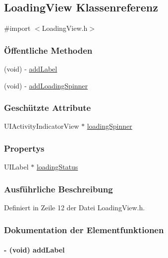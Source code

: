 \hypertarget{interface_loading_view}{
\subsection{LoadingView Klassenreferenz}
\label{interface_loading_view}
}


{\ttfamily \#import $<$LoadingView.h$>$}\subsubsection*{Öffentliche Methoden}
\begin{DoxyCompactItemize}
\item 
(void) -\/ \hyperlink{interface_loading_view_a06c086509cd10697ee633fb93d9eadf7}{addLabel}
\item 
(void) -\/ \hyperlink{interface_loading_view_a4b7cbaae54014af138245cdcd176ee45}{addLoadingSpinner}
\end{DoxyCompactItemize}
\subsubsection*{Geschützte Attribute}
\begin{DoxyCompactItemize}
\item 
UIActivityIndicatorView $\ast$ \hyperlink{interface_loading_view_a79c7dd7cab2fe9664dbae7d672bdc8cd}{loadingSpinner}
\end{DoxyCompactItemize}
\subsubsection*{Propertys}
\begin{DoxyCompactItemize}
\item 
UILabel $\ast$ \hyperlink{interface_loading_view_a48f535017836613ddaf6a956643afa31}{loadingStatus}
\end{DoxyCompactItemize}


\subsubsection{Ausführliche Beschreibung}


Definiert in Zeile 12 der Datei LoadingView.h.

\subsubsection{Dokumentation der Elementfunktionen}
\hypertarget{interface_loading_view_a06c086509cd10697ee633fb93d9eadf7}{
\paragraph[{addLabel}]{\setlength{\rightskip}{0pt plus 5cm}-\/ (void) addLabel }\hfill}
\label{interface_loading_view_a06c086509cd10697ee633fb93d9eadf7}


